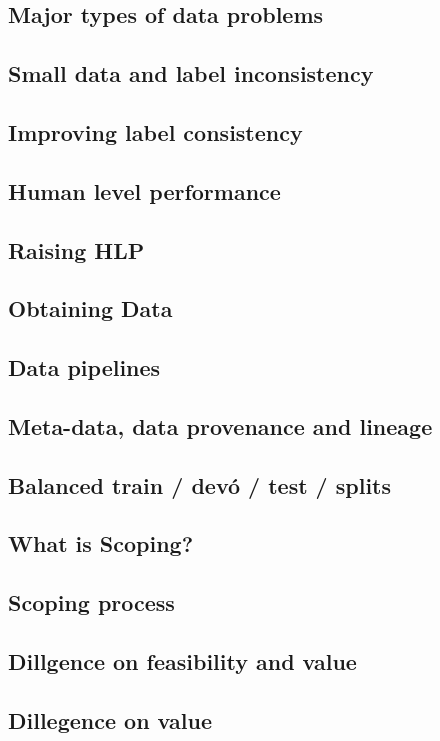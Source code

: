 \subsection{Major types of data problems}
\subsection{Small data and label inconsistency}
\subsection{Improving label consistency}
\subsection{Human level performance}
\subsection{Raising HLP}
\subsection{Obtaining Data}
\subsection{Data pipelines}
\subsection{Meta-data, data provenance and lineage}
\subsection{Balanced train / devó / test / splits}
\subsection{What is Scoping?}
\subsection{Scoping process}
\subsection{Dillgence on feasibility and value}
\subsection{Dillegence on value}
